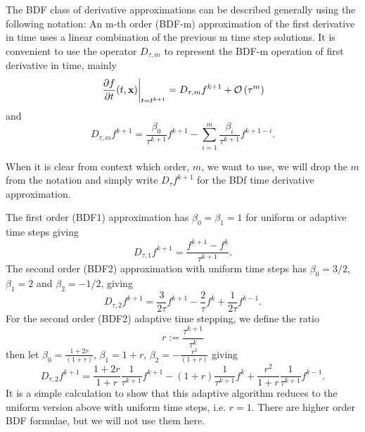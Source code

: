 \documentclass[letterpaper]{erdc}
\begin{document}
The BDF class of derivative approximations can be described generally using the
following notation: An m-th order (BDF-m) approximation of the first derivative
in time uses a linear combination of the previous m time step solutions. It is
convenient to use the operator $D_{\tau,m}$ to represent the BDF-m operation of
first derivative in time, mainly
\begin{equation}
 \left.\frac{\partial f}{\partial t}(t,\textbf{x})\right|_{t=t^{k+1}} =  D_{\tau,m}f^{k+1} + \mathcal{O}\left(\tau^m\right)
\end{equation}
and
\begin{equation}
  D_{\tau,m}f^{k+1} =  \frac{\beta_0}{\tau^{k+1}}f^{k+1} - \displaystyle\sum_{i=1}^{m} \frac{\beta_{i}}{\tau^{k+1}} f^{k+1-i}.
\end{equation}

\begin{remark}
  When it is clear from context which order, $m$, we want to use, we will drop
  the $m$ from the notation and simply write $D_{\tau}f^{k+1}$ for the BDf time
  derivative approximation.
\end{remark}

The first order (BDF1) approximation has $\beta_0 = \beta_1 = 1$ for uniform or
adaptive time steps giving
\begin{equation}
  D_{\tau,1} f^{k+1} = \frac{f^{k+1} - f^{k}}{\tau^{k+1}}.
\end{equation}
The second order (BDF2) approximation with uniform time steps has
$\beta_0 = 3/2$, $\beta_1 = 2$ and $\beta_2 = -1/2$, giving
\begin{equation}  
  D_{\tau,2} f^{k+1} = \frac{3}{2\tau}f^{k+1} - \frac{2}{\tau}f^{k} + \frac{1}{2\tau}f^{k-1}.
\end{equation}
For the second order (BDF2) adaptive time stepping, we define the ratio
\begin{equation}
  r:=\frac{\tau^{k+1}}{\tau^{k}}
\end{equation}
then let $\beta_0 = \frac{1+2r}{(1+r)}$, $\beta_1 = 1+r$, $\beta_2 = -\frac{r^2}{(1+r)}$ giving
\begin{equation} \label{eq:bdf2withvariabletimestep} 
  D_{\tau,2} f^{k+1} = \frac{1+2r}{1+r}\frac{1}{\tau^{k+1}}f^{k+1} - (1+r)\frac{1}{\tau^{k+1}}f^{k} + \frac{r^2}{1+r}\frac{1}{\tau^{k+1}}f^{k-1}.
\end{equation}
It is a simple calculation to show that this adaptive algorithm reduces to the
uniform version above with uniform time steps, i.e. $r=1$.  There are higher
order BDF formulae, but we will not use them here.
\end{document}
